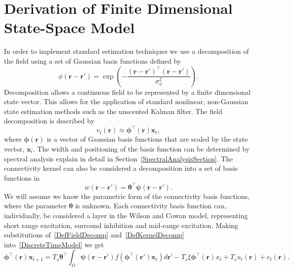 \documentclass[12pt]{iopart}
\begin{document}
\section{Derivation of Finite Dimensional State-Space Model} In order to implement standard estimation techniques we use a decomposition of the field using a set of Gaussian basis functions defined by
\begin{equation}\label{eq:FieldBasisFunction}
	\phi\left(\mathbf{r}-\mathbf{r}'\right) =
\exp{\left(-\frac{(\mathbf{r}-\mathbf{r}')^\top(\mathbf{r}-\mathbf{r}')}{\sigma_{\phi}^2}\right)}. 
\end{equation}
 Decomposition allows a continuous field to be represented by a finite dimensional state vector. This allows for the application of standard nonlinear, non-Gaussian state estimation methods such as the unscented Kalman filter. The field decomposition is described by 
\begin{equation}
	\label{DefFieldDecomp} v_t\left(\mathbf{r}\right) \approx \boldsymbol{\phi}^{\top}\left(\mathbf{r}\right) \mathbf{x}_t, 
\end{equation}
where $\mathbf{\boldsymbol{\phi}}(\mathbf{r})$ is a vector of Gaussian basis functions that are scaled by the state vector, $\mathbf{x}_t$. The width and positioning of the basis function can be determined by spectral analysis explain in detail in Section~\ref{SpectralAnalysisSection}. The connectivity kernel can also be considered a decomposition into a set of basis functions in 
\begin{equation}
	\label{DefKernelDecomp} w\left(\mathbf{r}-\mathbf{r}'\right) = \boldsymbol{\theta}^{\top} \boldsymbol{\psi}\left(\mathbf{r}-\mathbf{r}'\right). 
\end{equation}
We will assume we know the parametric form of the connectivity basis functions, where the parameter $\boldsymbol{\theta}$ is unknown. Each connectivity basis function can, individually, be considered a layer in the Wilson and Cowan model, representing short range excitation, surround inhibition and mid-range excitation. Making substitutions of~\ref{DefFieldDecomp} and~\ref{DefKernelDecomp} into~\ref{DiscreteTimeModel} we get 
\begin{equation}
	\label{reduced continuous model} \boldsymbol{\phi}^{\top}\left( \mathbf{r} \right) \mathbf{x}_{t+1} = T_s\boldsymbol{\theta}^{\top}\int_\Omega {\boldsymbol{\psi} \left(\mathbf{r}-\mathbf{r}'\right) f\left( \boldsymbol{\phi} ^{\top}\left(\mathbf{r}'\right)\mathbf{x}_t \right)d\mathbf{r}'} - T_s\xi\boldsymbol{\phi}^{\top}\left(\mathbf{r}\right)x_t + T_s u_t\left(\mathbf{r}\right) + e_t\left(\mathbf{r}\right). 
\end{equation}
\end{document}
